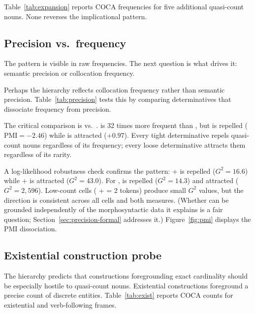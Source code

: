 \documentclass[12pt,a4paper]{article}
\begin{document}


Table~\ref{tab:expansion} reports COCA frequencies for five additional quasi-count nouns. None reverses the implicational pattern.



\subsection{Precision vs.\ frequency}\label{sec:precision}

The pattern is visible in raw frequencies. The next question is what drives it: semantic precision or collocation frequency.

Perhaps the hierarchy reflects collocation frequency rather than semantic precision. Table~\ref{tab:precision} tests this by comparing determinatives that dissociate frequency from precision.



The critical comparison is  vs.\ .  is 32 times more frequent than , but  is repelled ($\text{PMI} = -2.46$) while  is attracted ($+0.97$). Every tight determinative repels quasi-count nouns regardless of its frequency; every loose determinative attracts them regardless of its rarity.

A log-likelihood robustness check confirms the pattern:  +  is repelled ($G^2 = 16.6$) while  +  is attracted ($G^2 = 43.0$). For ,  is repelled ($G^2 = 14.3$) and  attracted ($G^2 = 2{,}596$). Low-count cells ( +  = 2 tokens) produce small $G^2$ values, but the direction is consistent across all cells and both measures. (Whether  can be grounded independently of the morphosyntactic data it explains is a fair question; Section~\ref{sec:precision-formal} addresses it.) Figure~\ref{fig:pmi} displays the PMI dissociation.



\subsection{Existential construction probe}\label{sec:existential}

The hierarchy predicts that constructions foregrounding exact cardinality should be especially hostile to quasi-count nouns. Existential  constructions foreground a precise count of discrete entities. Table~\ref{tab:exist} reports COCA counts for existential and verb-following frames.
\end{document}
